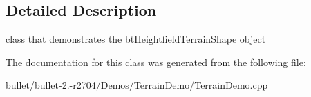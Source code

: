 \subsection{Detailed Description}
class that demonstrates the bt\+Heightfield\+Terrain\+Shape object 

The documentation for this class was generated from the following file\+:\begin{DoxyCompactItemize}
\item 
bullet/bullet-\/2.-\/r2704/\+Demos/\+Terrain\+Demo/Terrain\+Demo.\+cpp\end{DoxyCompactItemize}
